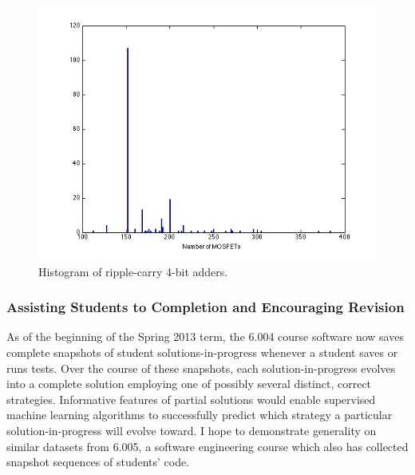 \documentclass[12pt]{article}
\begin{document}
\begin{figure}
\centering
\includegraphics[scale=0.8]{histOfTotalCircuitSizeLab2.png}
\caption{Histogram of ripple-carry 4-bit adders.}
\label{4bitAdders}
\end{figure}

\subsubsection{Assisting Students to Completion and Encouraging Revision}

As of the beginning of the Spring 2013 term, the 6.004 course software now saves complete snapshots of student solutions-in-progress whenever a student saves or runs tests. Over the course of these snapshots, each solution-in-progress evolves into a complete solution employing one of possibly several distinct, correct strategies. Informative features of partial solutions would enable supervised machine learning algorithms to successfully predict which strategy a particular solution-in-progress will evolve toward. I hope to demonstrate generality on similar datasets from 6.005, a software engineering course which also has collected snapshot sequences of students' code.
\end{document}
